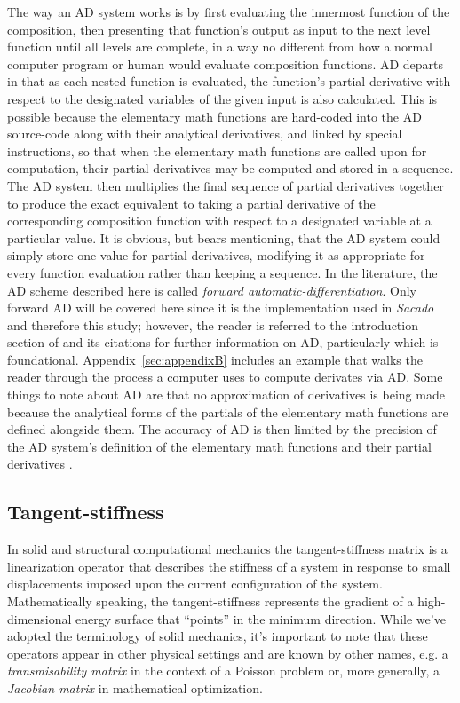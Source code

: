 \documentclass[preprint,12pt]{elsarticle}
\begin{document}
The way an AD system works is by first evaluating the innermost function of the composition, then presenting that function's output as input to the next level function until all levels are complete, in a way no different from how a normal computer program or human would evaluate composition functions.  AD departs in that as each nested function is evaluated, the function's partial derivative with respect to the designated variables of the given input is also calculated.  This is possible because the elementary math functions are hard-coded into the AD source-code along with their analytical derivatives, and linked by special instructions, so that when the elementary math functions are called upon for computation, their partial derivatives may be computed and stored in a sequence. The AD system then multiplies the final sequence of partial derivatives together to produce the exact equivalent to taking a partial derivative of the corresponding composition function with respect to a designated variable at a particular value. It is obvious, but bears mentioning, that the AD system could simply store one value for partial derivatives, modifying it as appropriate for every function evaluation rather than keeping a sequence.  In the literature, the AD scheme described here is called \emph{forward automatic-differentiation}. Only forward AD will be covered here since it is the implementation used in \emph{Sacado} and therefore this study; however, the reader is referred to the introduction section of \cite{ref-AD-methods} and its citations for further information on AD, particularly \cite{ref-on-AD} which is foundational. Appendix~\ref{sec:appendixB} includes an example that walks the reader through the process a computer uses to compute derivates via AD.  Some things to note about AD are that no approximation of derivatives is being made because the analytical forms of the partials of the elementary math functions are defined alongside them. The accuracy of AD is then limited by the precision of the AD system's definition of the elementary math functions and their partial derivatives .
 
\subsection{Tangent-stiffness} 

In solid and structural computational mechanics the tangent-stiffness matrix is a linearization operator that describes the stiffness of a system in response to small displacements imposed upon the current configuration of the system.  Mathematically speaking, the tangent-stiffness represents the gradient of a high-dimensional energy surface that ``points'' in the minimum direction. While we've adopted the terminology of solid mechanics, it's important to note that these operators appear in other physical settings and are known by other names, e.g. a \emph{transmisability matrix} in the context of a Poisson problem or, more generally, a \emph{Jacobian matrix} in mathematical optimization.
\end{document}
